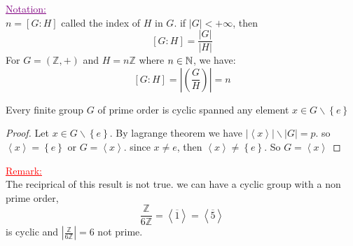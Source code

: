 \noindent
\textcolor{purple}{
\underline{
Notation:
}\\
}
$n = \left[ G:H \right] $ called the index of $H $ in $G $. if $\left| G \right|  <  +\infty  $,
then \[
\left[ G:H \right] = \frac{\left| G \right|  }{\left| H \right|  }
\]
For $G = \left( \mathbb{Z}, + \right)  $ and $H = n \mathbb{Z}$ where $n \in  \mathbb{N} $, we have: 
\[
\left[ G:H \right] = \left| \left( \frac{G}{H} \right)  \right|  = n
\]
\begin{corollary}[]
Every finite group $G $ of prime order is cyclic spanned any element $x \in   G \backslash \left\{ e \right\} $ 
\end{corollary}
\begin{proof}
Let $x \in  G \backslash  \left\{  e \right\} $. By lagrange theorem we have 
$\left| \left\langle x \right\rangle  \right|  \backslash  \left| G \right|  = p $. 
so $\left\langle x \right\rangle = \left\{ e \right\} $ or $G = \left\langle x \right\rangle  $. 
since $ x \neq e $, then $\left\langle x \right\rangle \neq \left\{ e \right\} $. So $G = \left\langle x \right\rangle  $ 
\end{proof}
\noindent
\textcolor{red}{
\underline{
Remark:
}
}\\
The reciprical of this result is not true. we can have a cyclic group with a non prime order, 
\[
\frac{\mathbb{Z}}{6 \mathbb{Z}} = 
\left\langle \overline{1} \right\rangle =
\left\langle \overline{5} \right\rangle 
\]
is cyclic and $\left| \frac{\mathbb{Z}}{6 \mathbb{Z}} \right|  = 6 $ not prime.
